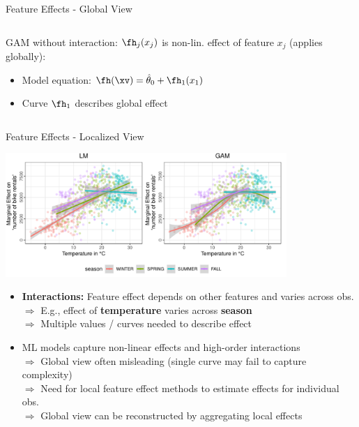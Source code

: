 \documentclass[11pt,compress,t,notes=noshow, aspectratio=169, xcolor=table]{beamer}
\begin{document}
\begin{frame}{Feature Effects - Global View}
\begin{columns}[T, totalwidth=\textwidth]
\begin{column}{0.49\linewidth}
\bigskip
GAM without interaction: $\fh_j(x_j)$ is non-lin. effect of feature $x_j$  (applies globally):
\begin{itemize}
    \item Model equation: $\fh(\xv) = \hat\theta_0 + \fh_1(x_1)$
    \item Curve $\fh_1$ describes global effect
\end{itemize}
\end{column}
\end{columns}

\end{frame}


\begin{frame}{Feature Effects - Localized View}

\centerline{\includegraphics[width=0.8\textwidth, trim=0cm 0.1cm 0cm 0cm, clip]{figure/lm_main_interactions}}

\begin{itemize}
    \item \textbf{Interactions:} Feature effect depends on other features and varies across obs. \\ 
    $\Rightarrow$ E.g., effect of \textbf{temperature} varies across \textbf{season}\\
    $\Rightarrow$ Multiple values / curves needed to describe effect
    \item ML models capture non-linear effects and high-order interactions \\
    $\Rightarrow$ Global view often misleading (single curve may fail to capture complexity)\\
    $\Rightarrow$ Need for local feature effect methods to estimate effects for individual obs.\\
    $\Rightarrow$ Global view can be reconstructed by aggregating local effects
\end{itemize}

\end{frame}
\end{document}
